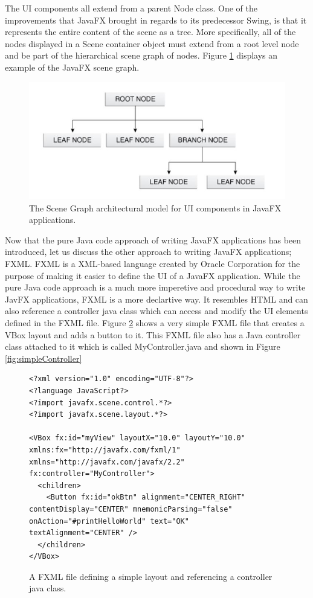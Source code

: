 The UI components all extend from a parent Node class. One of the improvements that JavaFX brought in regards to its predecessor Swing, is that it represents the entire content of the scene as a tree. More specifically, all of the nodes displayed in a Scene container object must extend from a root level node and be part of the hierarchical scene graph of nodes. Figure \ref{fig:javafxSceneGraph}  displays an example of the JavaFX scene graph. 
\begin{figure}[th]
\centering
\includegraphics[scale=0.5]{Figures/javafx_scenegraph.JPG}
\caption{The Scene Graph architectural model for UI components in JavaFX applications.}
\label{fig:javafxSceneGraph}
\end{figure}


Now that the pure Java code approach of writing JavaFX applications has been introduced, let us discuss the other approach to writing JavaFX applications; FXML. FXML is a XML-based language created by Oracle Corporation for the purpose of making it easier to define the UI of a JavaFX application. While the pure Java code approach is a much more imperetive and procedural way to write JavFX applications, FXML is a more declartive way. It resembles HTML and can also reference a controller java class which can access and modify the UI elements defined in the FXML file. Figure \ref{fig:simpleFXML} shows a very simple FXML file that creates a VBox layout and adds a button to it. This FXML file also has a Java controller class attached to it which is called MyController.java and shown in Figure \ref{fig:simpleController}

\begin{figure}[th]
\centering
\begin{lstlisting}
<?xml version="1.0" encoding="UTF-8"?>
<?language JavaScript?>
<?import javafx.scene.control.*?>
<?import javafx.scene.layout.*?>

<VBox fx:id="myView" layoutX="10.0" layoutY="10.0" xmlns:fx="http://javafx.com/fxml/1" xmlns="http://javafx.com/javafx/2.2" fx:controller="MyController">
  <children>
    <Button fx:id="okBtn" alignment="CENTER_RIGHT" contentDisplay="CENTER" mnemonicParsing="false" onAction="#printHelloWorld" text="OK" textAlignment="CENTER" />
  </children>
</VBox>
\end{lstlisting}
\caption{A FXML file defining a simple layout and referencing a controller java class.}
\label{fig:simpleFXML}
\end{figure}


